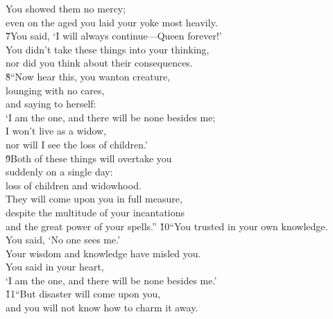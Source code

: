 \begin{poetry}
\poemll    You showed them no mercy; \\
\poemlll       even on the aged you laid your yoke most heavily. \\
\poeml \v{7}You said, `I will always continue---Queen forever!' \\
\poemll    You didn't take these things into your thinking, \\
\poemlll       nor did you think about their consequences. \\
\poeml \v{8}``Now hear this, you wanton creature, \\
\poemll    lounging with no cares, \\
\poeml and saying to herself: \\
\poemll    `I am the one, and there will be none besides me; \\
\poeml I won't live as a widow, \\
\poemll    nor will I see the loss of children.' \\
\poeml \v{9}Both of these things will overtake you \\
\poemll    suddenly on a single day: \\
\poeml loss of children and widowhood. \\
\poemll    They will come upon you in full measure, \\
\poeml despite the multitude of your incantations \\
\poemll    and the great power of your spells.''
\poeml \v{10}``You trusted in your own knowledge. \\
\poemll    You said, `No one sees me.' \\
\poeml Your wisdom and knowledge have misled you. \\
\poemll    You said in your heart, \\
\poemlll       `I am the one, and there will be none besides me.' \\
\poeml \v{11}``But disaster will come upon you, \\
\poemll    and you will not know how to charm it away. \\

\end{poetry}

